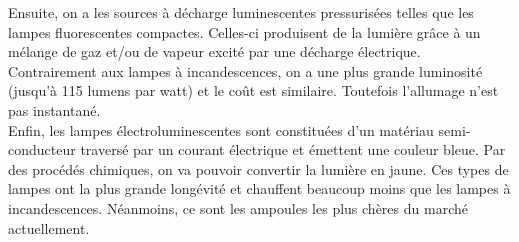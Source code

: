 Ensuite, on a les sources à décharge luminescentes pressurisées telles que les lampes fluorescentes compactes. Celles-ci produisent de la lumière grâce à un mélange de gaz et/ou de vapeur excité par une décharge électrique. Contrairement aux lampes à incandescences, on a une plus grande luminosité (jusqu'à 115 lumens par watt) et le coût est similaire. Toutefois l'allumage n'est pas instantané.\\
		
Enfin, les lampes électroluminescentes sont constituées d'un matériau semi-conducteur traversé par un courant électrique et émettent une couleur bleue. Par des procédés chimiques, on va pouvoir convertir la lumière en jaune. Ces types de lampes ont la plus grande longévité et chauffent beaucoup moins que les lampes à incandescences. Néanmoins, ce sont les ampoules les plus chères du marché actuellement. \\